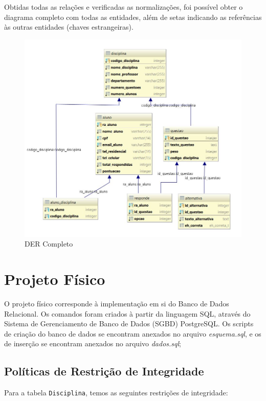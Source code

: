 \documentclass[12pt,a4paper]{article}
\begin{document}
Obtidas todas as relações e verificadas as normalizações, foi possível obter o diagrama completo com todas as entidades, além de setas indicando as referências às outras entidades (chaves estrangeiras).

\begin{center}
\begin{figure}[h]
    \centering
    \includegraphics[width=\linewidth]{mapeamento.jpg}
    \caption{DER Completo}
    \label{fig:DERcompleto}
\end{figure}
\end{center}

\newpage
\section{Projeto Físico}

O projeto físico corresponde à implementação em si do Banco de Dados Relacional. Os comandos foram criados à partir da linguagem SQL, através do Sistema de Gerenciamento de Banco de Dados (SGBD) PostgreSQL. Os scripts de criação do banco de dados se encontram anexados no arquivo \textit{esquema.sql}, e os de inserção se encontram anexados no arquivo \textit{dados.sql};
\vspace{0.5cm}
\subsection{Políticas de Restrição de Integridade}
\vspace{0.5cm}
Para a tabela \texttt{Disciplina}, temos as seguintes restrições de integridade:
\end{document}
